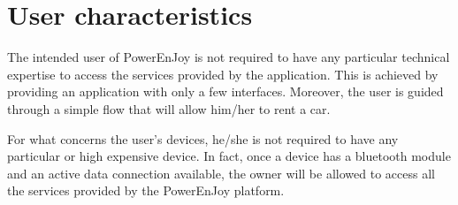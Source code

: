 \section{User characteristics}
The intended user of PowerEnJoy is not required to have any particular technical expertise to access the services provided by the application. This is achieved by providing  an application with only a few interfaces. Moreover, the user is guided through a simple flow that will allow him/her to rent a car.

For what concerns the user's devices, he/she is not required to have any particular or high expensive device. In fact, once a device has a bluetooth module and an active data connection available, the owner will be allowed to access all the services provided by the PowerEnJoy platform.